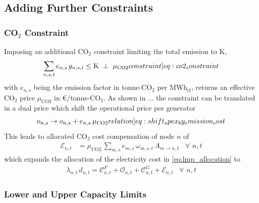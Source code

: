 \documentclass[11pt,twocolumn]{article}
\newcommand{\generation}[1][n]{g_{#1,s,t}}
\newcommand{\generationshare}[1][n]{\omega_{#1,s,t}}
\newcommand{\capacityGeneration}{G_{n,s}}
\newcommand{\capexGeneration}{c_{n,s}}
\newcommand{\opexGeneration}[1][n]{o_{#1,s}}
\newcommand{\nodaldemand}[1][n]{d_{#1,t}}
\newcommand{\lmp}[1][n]{\lambda_{#1,t}}
\newcommand{\allocatePeer}[1][m \rightarrow n]{A_{#1,t}}
\newcommand{\allocateCapexGeneration}[1][n]{\mathcal{C}^{G}_{#1,t}}
\newcommand{\allocateCapexFlow}[1][n]{\mathcal{C}^{F}_{#1,t}}
\newcommand{\allocateOpex}[1][n]{\mathcal{O}_{#1,t}}
\newcommand{\allocateEmissionCost}[1][n]{\mathcal{E}_{#1,t}}
\newcommand{\emission}[1][n]{e_{#1,s}}
\newcommand{\emissionPrice}{\mu_{\text{CO2}}}
\newcommand{\megawatthour}{MWh$_\text{el}$}
\newcommand{\resultsin}[1]{\hspace{6pt} \bot  \hspace{6pt} #1}
\newcommand{\Forall}[1]{\hspace{10pt} \forall \,\, #1 }
\begin{document}
\subsection{Adding Further Constraints}
\subsubsection*{CO$_2$ Constraint}

Imposing an additional CO$_2$ constraint limiting the total emission to K,  
\begin{align}
 \sum_{n,s,t} \emission \, \generation \le \text{K} \resultsin{\emissionPrice} 
 \label[constraint]{eq:co2_constraint}
\end{align}
with $\emission$ being the emission factor in tonne-CO$_2$ per \megawatthour, returns an effective CO$_2$ price $\emissionPrice$ in \euro/tonne-CO$_2$. 
% 
As shown in ... the constraint can be translated in a dual price which shift the operational price per generator
\begin{align}
\opexGeneration \rightarrow \opexGeneration + \emission \, \emissionPrice \label[relation]{eq:shift_opex_by_emission_cost}
\end{align}
This leads to allocated CO$_2$ cost compensation of node $n$ of
 \begin{align}
 \allocateEmissionCost &= \emissionPrice \, \sum_{m,s} \emission[m] \, \generationshare[m] \, \allocatePeer \Forall{n,t} \label{eq:allocate_emissionPrice}
\end{align}
which expands the allocation of the electricity cost in \cref{eq:lmp_allocation} to 
\begin{align}
 \lmp \, \nodaldemand = \allocateCapexFlow + \allocateOpex + \allocateCapexGeneration  + \allocateEmissionCost \Forall{n,t}
 \label{eq:lmp_allocation_with_emission}
\end{align}

\subsubsection*{Lower and Upper Capacity Limits}
\end{document}
